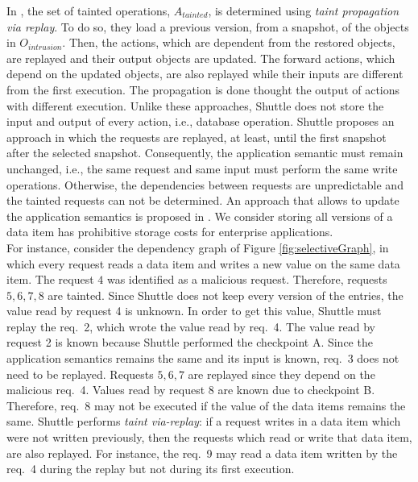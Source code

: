 In \cite{goel,retro}, the set of tainted operations, $A_{tainted}$, is determined using \textit{taint propagation via replay}. To do so, they load a previous version, from a snapshot, of the objects in $O_{intrusion}$. Then, the actions, which are dependent from the restored objects, are replayed and their output objects are updated. The forward actions, which depend on the updated objects, are also replayed while their inputs are different from the first execution. The propagation is done thought the output of actions with different execution.
Unlike these approaches, Shuttle does not store the input and output of every action, i.e., database operation. Shuttle proposes an approach in which the requests are replayed, at least, until the first snapshot after the selected snapshot. Consequently, the application semantic must remain unchanged, i.e., the same request and same input must perform the same write operations. Otherwise, the dependencies between requests are unpredictable and the tainted requests can not be determined. An approach that allows to update the application semantics is proposed in \cite{warp}. We consider storing all versions of a data item has prohibitive storage costs for enterprise applications.\\

For instance, consider the dependency graph of Figure \ref{fig:selectiveGraph}, in which every request reads a data item and writes a new value on the same data item. The request $4$ was identified as a malicious request. Therefore, requests $5,6,7,8$ are tainted. Since Shuttle does not keep every version of the entries, the value read by request 4 is unknown. In order to get this value, Shuttle must replay the {req.~2}, which wrote the value read by {req.~4}. The value read by request 2 is known because Shuttle performed the checkpoint A. Since the application semantics remains the same and its input is known, {req.~3} does not need to be replayed. Requests $5,6,7$ are replayed since they depend on the malicious {req.~4}. Values read by request 8 are known due to checkpoint B. Therefore, {req.~8} may not be executed if the value of the data items remains the same. Shuttle performs \textit{taint via-replay}: if a request writes in a data item which were not written previously, then the requests which read or write that data item, are also replayed. For instance, the {req.~9} may read a data item written by the {req.~4} during the replay but not during its first execution.\\


